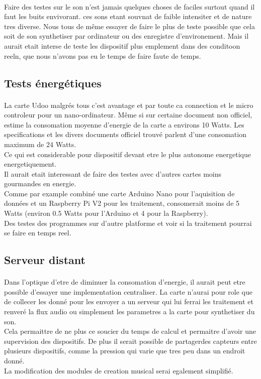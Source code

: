 \documentclass[a4paper, titlepage, oneside, 12pt]{article}%
\begin{document}
\paragraph{}
Faire des testes sur le son n'est jamais quelques choses de faciles surtout quand il faut les buits envivorant. ces sons etant souvnat de faible intensiter et de nature tres diverse.
Nous tous de même essayer de faire le plus de teste possible que cela soit de son synthetiser par ordinateur ou des enregistre d'environement. Mais il aurait etait interse de teste les dispositif plus emplement dans des conditoon reeln, que nous n'avons pas eu le temps de faire faute de temps. 

\subsection{Tests énergétiques}
\paragraph{}
La carte Udoo malgrés tous c'est avantage et par toute ca connection et le micro controleur pour un nano-ordinateur. Même si sur certaine document non officiel, estime la consomation moyenne d'energie de la carte a environs 10 Watts. Les specifications et les divers documents officiel trouvé parlent d'une consomation maximum de 24 Watts.\\
Ce qui est considerable pour dispositif devant etre le plus autonome energetique energetiquement.\\
Il aurait etait interessant de faire des testes avec d'autres cartes moins gourmandes en energie.\\
Comme par example combiné une carte Arduino Nano pour l'aquisition de données et un Raspberry Pi V2 pour les traitement, consomerait moins de 5 Watts (environ  0.5 Watts pour l'Arduino et 4 pour la Raspberry).\\
Des testes des programmes sur d'autre platforme et voir si la traitement pourrai se faire en temps reel.

\subsection{Serveur distant}
\paragraph{}
Dans l'optique d'etre de diminuer la consomation d'energie, il aurait peut etre possible d'essayer une implementation centraliser. La carte n'aurai pour role que de collecer les donné pour les envoyer a un serveur qui lui ferrai les traitement et renveré la flux audio ou simplement les parametres a la carte pour synthetiser du son.\\
Cela permaittre de ne plus ce soucier du temps de calcul et permaitre d'avoir une supervision des dispositifs. De plus il serait possible de partagerdes capteurs entre plusieurs dispositifs, comme la pression qui varie que tres peu dans un endroit donné.\\
La modification des modules de creation musical serai egalement simplifié.
 
\end{document}
